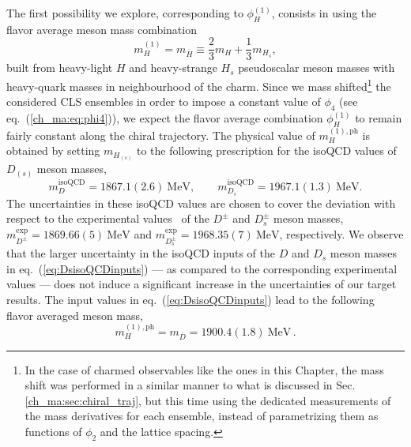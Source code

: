 The first possibility we explore, corresponding to $\phi_H^{(1)}$, consists in using the flavor average meson mass combination
\begin{equation}
        m_H^{(1)} = m_{\overline{H}} \equiv \frac{2}{3} m_H + \frac{1}{3}m_{H_s},
        \label{eq:fl_av_matching}
\end{equation}
built from heavy-light $H$ and heavy-strange $H_s$ pseudoscalar meson masses with heavy-quark masses in neighbourhood of the charm.
%
Since we mass shifted\footnote{In the case of charmed observables like the ones in this Chapter, the mass shift was performed in a similar manner to what is discussed in Sec. \ref{ch_ma:sec:chiral_traj}, but this time using the dedicated measurements of the mass derivatives for each ensemble, instead of parametrizing them as functions of $\phi_2$ and the lattice spacing.} the considered CLS ensembles in order to impose a constant value of $\phi_4$ (see eq.~(\ref{ch_ma:eq:phi4})), we expect the flavor average combination $\phi_H^{(1)}$ to remain fairly constant along the chiral trajectory. The physical value of $m_H^{(1), \mathrm{ph}}$ is obtained by setting $m_{H_{(s)}}$ to the following prescription for the isoQCD values of $D_{(s)}$ meson masses,
%
\begin{equation}
    m_D^{\mathrm{isoQCD}} = 1867.1(2.6)  \ \mathrm{MeV}, \qquad m_{D_s}^{\mathrm{isoQCD}} = 1967.1(1.3) \ \mathrm{MeV}.
\label{eq:DsisoQCDinputs}
\end{equation}
%
The uncertainties in these isoQCD values are chosen to cover the deviation with respect to the experimental values~\cite{ParticleDataGroup:2022pth} of the $D^{\pm}$ and $D_s^{\pm}$ meson masses, $m_{D^\pm}^{\mathrm{exp}} = 1869.66(5) \ \mathrm{MeV}$ and $m_{D_s^\pm}^{\mathrm{exp}} = 1968.35(7) \ \mathrm{MeV}$, respectively. We observe that the larger uncertainty in the isoQCD inputs of the $D$ and $D_s$ meson masses in eq.~(\ref{eq:DsisoQCDinputs}) --- as compared to the corresponding experimental values --- does not induce a significant increase in the uncertainties of our target results. The input values in eq.~(\ref{eq:DsisoQCDinputs}) lead to the following flavor averaged meson mass,
%
\begin{equation}
         m_H^{(1), \mathrm{ph}} = m_{\overline{D}} = 1900.4(1.8) \ \mathrm{MeV}\,.
\end{equation}
% 

